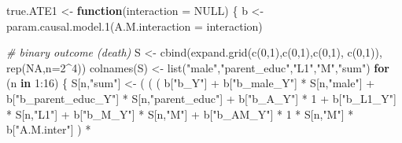 \documentclass[
]{book}
\newenvironment{Shaded}{\begin{snugshade}}{\end{snugshade}}
\newcommand{\AttributeTok}[1]{\textcolor[rgb]{0.77,0.63,0.00}{#1}}
\newcommand{\CommentTok}[1]{\textcolor[rgb]{0.56,0.35,0.01}{\textit{#1}}}
\newcommand{\ConstantTok}[1]{\textcolor[rgb]{0.00,0.00,0.00}{#1}}
\newcommand{\ControlFlowTok}[1]{\textcolor[rgb]{0.13,0.29,0.53}{\textbf{#1}}}
\newcommand{\DecValTok}[1]{\textcolor[rgb]{0.00,0.00,0.81}{#1}}
\newcommand{\FunctionTok}[1]{\textcolor[rgb]{0.00,0.00,0.00}{#1}}
\newcommand{\NormalTok}[1]{#1}
\newcommand{\OtherTok}[1]{\textcolor[rgb]{0.56,0.35,0.01}{#1}}
\newcommand{\SpecialCharTok}[1]{\textcolor[rgb]{0.00,0.00,0.00}{#1}}
\newcommand{\StringTok}[1]{\textcolor[rgb]{0.31,0.60,0.02}{#1}}
\begin{document}
\begin{Shaded}
\begin{Highlighting}[]
\NormalTok{true.ATE1 }\OtherTok{\textless{}{-}} \ControlFlowTok{function}\NormalTok{(}\AttributeTok{interaction =} \ConstantTok{NULL}\NormalTok{) \{}
\NormalTok{  b }\OtherTok{\textless{}{-}} \FunctionTok{param.causal.model.1}\NormalTok{(}\AttributeTok{A.M.interaction =}\NormalTok{ interaction)}
  
  \CommentTok{\# binary outcome (death)}
\NormalTok{  S }\OtherTok{\textless{}{-}} \FunctionTok{cbind}\NormalTok{(}\FunctionTok{expand.grid}\NormalTok{(}\FunctionTok{c}\NormalTok{(}\DecValTok{0}\NormalTok{,}\DecValTok{1}\NormalTok{),}\FunctionTok{c}\NormalTok{(}\DecValTok{0}\NormalTok{,}\DecValTok{1}\NormalTok{),}\FunctionTok{c}\NormalTok{(}\DecValTok{0}\NormalTok{,}\DecValTok{1}\NormalTok{), }\FunctionTok{c}\NormalTok{(}\DecValTok{0}\NormalTok{,}\DecValTok{1}\NormalTok{)), }\FunctionTok{rep}\NormalTok{(}\ConstantTok{NA}\NormalTok{,}\AttributeTok{n=}\DecValTok{2}\SpecialCharTok{\^{}}\DecValTok{4}\NormalTok{))}
  \FunctionTok{colnames}\NormalTok{(S) }\OtherTok{\textless{}{-}} \FunctionTok{list}\NormalTok{(}\StringTok{"male"}\NormalTok{,}\StringTok{"parent\_educ"}\NormalTok{,}\StringTok{"L1"}\NormalTok{,}\StringTok{"M"}\NormalTok{,}\StringTok{"sum"}\NormalTok{)}
  \ControlFlowTok{for}\NormalTok{ (n }\ControlFlowTok{in} \DecValTok{1}\SpecialCharTok{:}\DecValTok{16}\NormalTok{) \{}
\NormalTok{    S[n,}\StringTok{"sum"}\NormalTok{] }\OtherTok{\textless{}{-}}\NormalTok{ ( ( ( b[}\StringTok{"b\_Y"}\NormalTok{] }\SpecialCharTok{+} 
\NormalTok{                      b[}\StringTok{"b\_male\_Y"}\NormalTok{] }\SpecialCharTok{*}\NormalTok{ S[n,}\StringTok{"male"}\NormalTok{] }\SpecialCharTok{+} 
\NormalTok{                      b[}\StringTok{"b\_parent\_educ\_Y"}\NormalTok{] }\SpecialCharTok{*}\NormalTok{ S[n,}\StringTok{"parent\_educ"}\NormalTok{] }\SpecialCharTok{+} 
\NormalTok{                      b[}\StringTok{"b\_A\_Y"}\NormalTok{] }\SpecialCharTok{*} \DecValTok{1} \SpecialCharTok{+} 
\NormalTok{                      b[}\StringTok{"b\_L1\_Y"}\NormalTok{] }\SpecialCharTok{*}\NormalTok{ S[n,}\StringTok{"L1"}\NormalTok{] }\SpecialCharTok{+}
\NormalTok{                      b[}\StringTok{"b\_M\_Y"}\NormalTok{] }\SpecialCharTok{*}\NormalTok{ S[n,}\StringTok{"M"}\NormalTok{] }\SpecialCharTok{+}
\NormalTok{                      b[}\StringTok{"b\_AM\_Y"}\NormalTok{] }\SpecialCharTok{*} \DecValTok{1} \SpecialCharTok{*}\NormalTok{ S[n,}\StringTok{"M"}\NormalTok{] }\SpecialCharTok{*}\NormalTok{ b[}\StringTok{"A.M.inter"}\NormalTok{] ) }\SpecialCharTok{*}

\end{Highlighting}
\end{Shaded}
\end{document}
